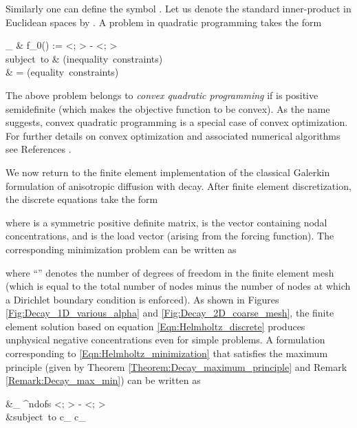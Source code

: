 \documentclass[11pt]{amsart}
\begin{document}
Similarly one can define the symbol . Let us denote the standard inner-product in 
Euclidean spaces by . A problem in quadratic programming takes the form

    _{}  & \quad f_0() :=  
    <;  > - <; > \\
\label{Eqn:Decay_QP_standard_inequality}
    \mbox{subject to} & \quad {}  \preceq {} 
    \quad \mbox{(inequality constraints)} \\
& \quad {}  =  \quad \mbox{(equality constraints)}
  
The above problem belongs to \emph{convex quadratic programming} if  
is positive semidefinite (which makes the objective function  
to be convex). As the name suggests, convex quadratic programming is a special case 
of convex optimization. For further details on convex optimization and associated 
numerical algorithms see References \cite{Boyd_convex_optimization,Nocedal_Wright,
Luenberger_Ye_Nonlinear_Programming}. 

We now return to the finite element implementation of the classical Galerkin formulation 
of anisotropic diffusion with decay. After finite element discretization, the discrete 
equations take the form

where  is a symmetric positive definite matrix,  is the 
vector containing nodal concentrations, and  is the load vector (arising 
from the forcing function). The corresponding minimization problem can be written as 

where ``'' denotes the number of degrees of freedom in the finite element mesh 
(which is equal to the total number of nodes minus the number of nodes at which a Dirichlet 
boundary condition is enforced). As shown in Figures \ref{Fig:Decay_1D_various_alpha} 
and \ref{Fig:Decay_2D_coarse_mesh}, the finite element solution based on equation 
\eqref{Eqn:Helmholtz_discrete} produces unphysical negative concentrations even for 
simple problems. A formulation corresponding to \eqref{Eqn:Helmholtz_minimization} 
that satisfies the maximum principle (given by Theorem \ref{Theorem:Decay_maximum_principle} 
and Remark \ref{Remark:Decay_max_min})  can be written as 

    &_{ \in {}^{ndofs}} \quad  
     <;   >  - 
    <; > \\
&\mbox{subject to} \quad c_{}  \preceq {} 
    \preceq c_{}  
  
\end{document}

